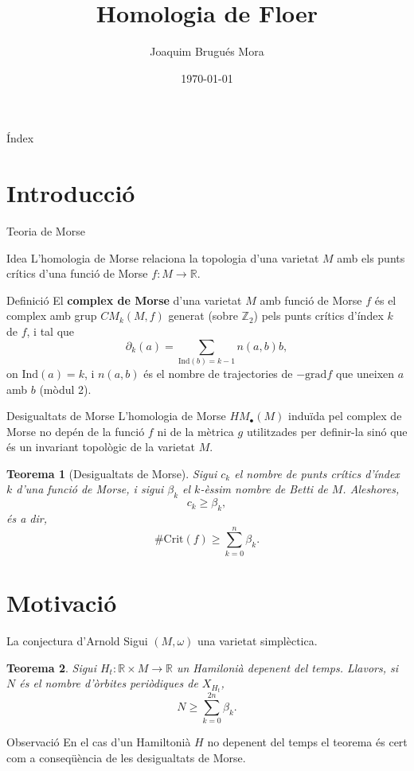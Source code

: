 \documentclass{beamer}
\title{Homologia de Floer}
\author{Joaquim Brugués Mora}
\institute{Facultat de Matemàtiques i Estadística\\ UPC}
\date{\today}
\newcommand{\con}[1]{\mathbb{#1}}
\newcommand{\R}{\con{R}}
\newtheorem{teorema}{Teorema}
\begin{document}
\begin{frame}
	\titlepage
\end{frame}

\begin{frame}{Índex}
	\tableofcontents
\end{frame}

\section{Introducció}

\begin{frame}{Teoria de Morse}
	\begin{block}{Idea}
		L'homologia de Morse relaciona la topologia d'una varietat $M$ amb els punts crítics d'una funció de Morse $f: M \rightarrow \R$.
	\end{block}

	\begin{block}{Definició}
		El {\bf complex de Morse} d'una varietat $M$ amb funció de Morse $f$ és el complex amb grup $CM_k(M,f)$ generat (sobre $\con{Z}_2$) pels punts crítics d'índex $k$ de $f$, i tal que
		\[\partial_k(a) = \sum_{\mathrm{Ind}(b) = k-1} n(a,b) b ,\]
		on $\mathrm{Ind}(a) = k$, i $n(a,b)$ és el nombre de trajectories de $-\mathrm{grad}f$ que uneixen $a$ amb $b$ (mòdul 2).
	\end{block}
\end{frame}

\begin{frame}{Desigualtats de Morse}
	L'homologia de Morse $HM_{\bullet}(M)$ induïda pel complex de Morse no depén de la funció $f$ ni de la mètrica $g$ utilitzades per definir-la sinó que és un invariant topològic de la varietat $M$.

	\begin{teorema}[Desigualtats de Morse]
		Sigui $c_k$ el nombre de punts crítics d'índex $k$ d'una funció de Morse, i sigui $\beta_k$ el $k$-èssim nombre de Betti de $M$. Aleshores,
		\[c_k \geq \beta_k ,\]
		és a dir,
		\[\# \mathrm{Crit}(f) \geq \sum_{k=0}^n \beta_k .\]
	\end{teorema}
\end{frame}

\section{Motivació}

\begin{frame}{La conjectura d'Arnold}
	Sigui $(M,\omega)$ una varietat simplèctica.

	\begin{teorema}
		Sigui $H_t : \R \times M \rightarrow \R$ un Hamilonià depenent del temps. Llavors, si $N$ és el nombre d'òrbites periòdiques de $X_{H_t}$,
		\[N \geq \sum_{k=0}^{2n} \beta_k .\]
	\end{teorema}

	\begin{block}{Observació}
		En el cas d'un Hamiltonià $H$ no depenent del temps el teorema és cert com a conseqüència de les desigualtats de Morse.
	\end{block}
\end{frame}
\end{document}
